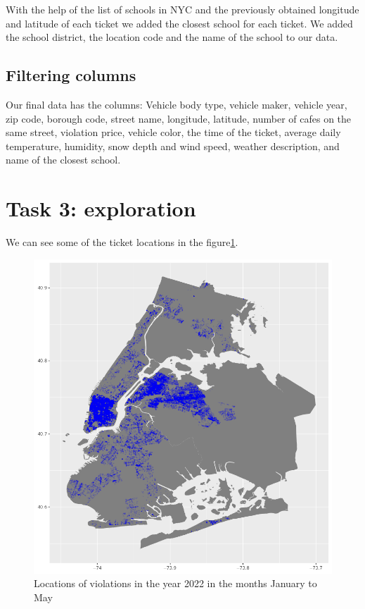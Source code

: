 \documentclass[12pt]{fphw}
\begin{document}
With the help of the list of schools in NYC\cite{school} and the previously obtained longitude and latitude of each ticket we added the closest school for each ticket. We added the school district, the location code and the name of the school to our data.

\subsection{Filtering columns}

Our final data has the columns: 
Vehicle body type, vehicle maker, vehicle year, zip code, borough code, street name, longitude, latitude, number of cafes on the same street, violation price, vehicle color, the time of the ticket, average daily temperature, humidity, snow depth and wind speed, weather description, and name of the closest school.


\section{Task 3: exploration}

We can see some of the ticket locations in the figure\ref{fig:map_1}.

\begin{figure}[h!]
  \label{fig:map_1}
  \includegraphics[width=1\textwidth]{figures/nyc.map.png}
  \caption{Locations of violations in the year 2022 in the months January to May}
\end{figure}
\end{document}
